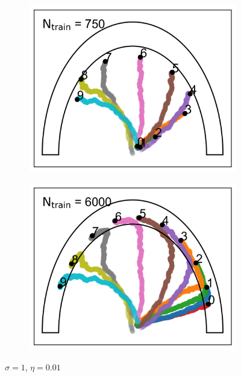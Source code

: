 \documentclass[aps,prb,twocolumn,superscriptaddress,floatfix,longbibliography]{revtex4-2}
\begin{document}
\begin{figure}
\begin{subfigure}[b]{0.24\textwidth}
      \includegraphics[width=\textwidth]{ej2_fig3_3.png}
      \caption{\label{fig:ej2_fig3_3}}
  \end{subfigure}
  \hfill
  \begin{subfigure}[b]{0.24\textwidth}
      \centering
      \includegraphics[width=\textwidth]{ej2_fig3_4.png}
      \caption{\label{fig:ej2_fig3_4}}
  \end{subfigure}
     \caption{$\sigma = 1$, $\eta = 0.01$}
     \label{fig:ej2_fig}
\end{figure}
\end{document}
